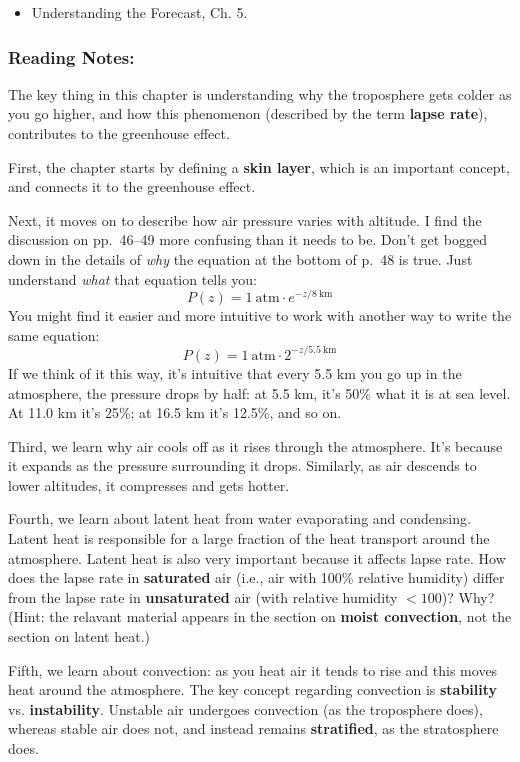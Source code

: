 \documentclass[
]{article}
\providecommand{\tightlist}{%
  \setlength{\itemsep}{0pt}\setlength{\parskip}{0pt}}
\begin{document}
\begin{itemize}
\tightlist
\item
  Understanding the Forecast, Ch. 5.
\end{itemize}

\hypertarget{reading-notes-4}{%
\subsubsection{Reading Notes:}\label{reading-notes-4}}

The key thing in this chapter is understanding why the troposphere gets
colder as you go higher, and how this phenomenon (described by the term
\textbf{lapse rate}), contributes to the greenhouse effect.

First, the chapter starts by defining a \textbf{skin layer}, which is an
important concept, and connects it to the greenhouse effect.

Next, it moves on to describe how air pressure varies with altitude. I
find the discussion on pp.~46--49 more confusing than it needs to be.
Don't get bogged down in the details of \emph{why} the equation at the
bottom of p.~48 is true. Just understand \emph{what} that equation tells
you: \[
  P(z) = 1~\text{atm}\cdot e^{-z/8~\text{km}}
\] You might find it easier and more intuitive to work with another way
to write the same equation: \[
  P(z) = 1~\text{atm}\cdot 2^{-z/5.5~\text{km}}
\] If we think of it this way, it's intuitive that every 5.5 km you go
up in the atmosphere, the pressure drops by half: at 5.5 km, it's 50\%
what it is at sea level. At 11.0 km it's 25\%; at 16.5 km it's 12.5\%,
and so on.

Third, we learn why air cools off as it rises through the atmosphere.
It's because it expands as the pressure surrounding it drops. Similarly,
as air descends to lower altitudes, it compresses and gets hotter.

Fourth, we learn about latent heat from water evaporating and
condensing. Latent heat is responsible for a large fraction of the heat
transport around the atmosphere. Latent heat is also very important
because it affects lapse rate. How does the lapse rate in
\textbf{saturated} air (i.e., air with 100\% relative humidity) differ
from the lapse rate in \textbf{unsaturated} air (with relative humidity
\(<100%
\))? Why? (Hint: the relavant material appears in the section on
\textbf{moist convection}, not the section on latent heat.)

Fifth, we learn about convection: as you heat air it tends to rise and
this moves heat around the atmosphere. The key concept regarding
convection is \textbf{stability} vs. \textbf{instability}. Unstable air
undergoes convection (as the troposphere does), whereas stable air does
not, and instead remains \textbf{stratified}, as the stratosphere does.
\end{document}
